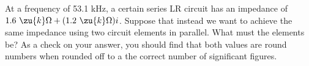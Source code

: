 At a frequency of 53.1 kHz, a certain series LR circuit has an impedance of $1.6\ \zu{k}\Omega+(1.2\ \zu{k}\Omega)i$.
Suppose that instead we want to achieve the same impedance using two circuit elements in parallel.
What must the elements be? As a check on your answer, you should find that both values are round numbers
when rounded off to a the correct number of significant figures.
